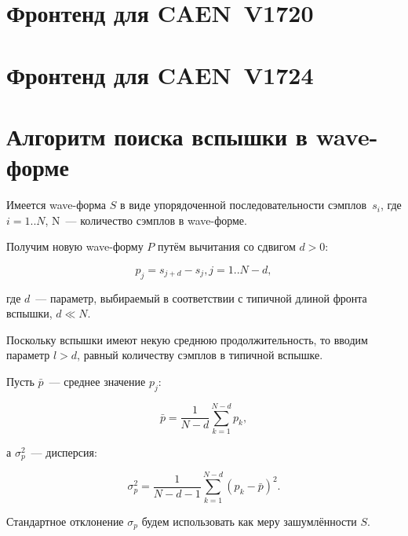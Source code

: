 \documentclass[12pt, a4paper, oneside, onecolumn]{book}
\newcommand{\APP}[1]{\mbox{\tt #1}}
\begin{document}

\newcommand{\FE}{\APP{fe-v1720}}
\newcommand{\DEVICE}{CAEN~V1720}

\chapter{Фронтенд для \DEVICE{}}
\label{sec-fe-v1720}




\renewcommand{\FE}{\APP{fe-v1724}}
\renewcommand{\DEVICE}{CAEN~V1724}

\chapter{Фронтенд для \DEVICE{}}




\appendix

\chapter{Алгоритм поиска вспышки в wave-форме}

Имеется wave-форма $S$ в виде упорядоченной последовательности сэмплов~$s_i$, где $i = 1..N$, N~--- количество сэмплов в wave-форме.

Получим новую wave-форму $P$ путём вычитания со сдвигом $d > 0$:

$$
p_j = s_{j+d} - s_j, j = 1..N-d,
$$

\noindent где $d$~--- параметр, выбираемый в соответствии с типичной длиной фронта вспышки, $d \ll N$.

Поскольку вспышки имеют некую среднюю продолжительность, то вводим параметр $l > d$, равный количеству сэмплов в типичной вспышке. 

Пусть $\bar{p}$~--- среднее значение $p_j$:

$$
\bar{p} = \frac{1}{N-d} \sum_{k=1}^{N-d} p_k,
$$

\noindent а $\sigma_p^2$~--- дисперсия:

$$
\sigma_p^2 = \frac{1}{N-d-1} \sum_{k=1}^{N-d} \left( p_k - \bar{p} \right) ^2.
$$

Стандартное отклонение $\sigma_p$ будем использовать как меру зашумлённости $S$.
\end{document}
